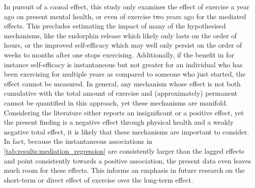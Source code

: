 In pursuit of a causal effect, this study only examines the effect of exercise a year ago on present mental health,
or even of exercise two years ago for the mediated effects.
This precludes estimating the impact of many of the hypothesised mechanisms, like the endorphin release which
likely only lasts on the order of hours, or the improved self-efficacy which may well only persist on the order of
weeks to months after one stops exercising.
Additionally, if the benefit in for instance self-efficacy is instantaneous but not greater for an individual
who has been exercising for multiple years as compared to someone who just started, the effect cannot be measured.
In general, any mechanism whose effect is not both cumulative with the total amount of exercise and (approximately)
permanent cannot be quantified in this approach, yet these mechanisms are manifold.
Considering the literature either reports an insignificant or a positive effect, yet the present finding is a
negative effect through physical health and a weakly negative total effect, it is likely that these
mechanisms are important to consider.
In fact, because the instantaneous associations in \cref{tab:results:mediation_regression} are consistently larger
than the lagged effects and point consistently towards a positive association,
the present data even leaves much room for these effects.
This informs an emphasis in future research on the short-term or direct effect of exercise over the long-term effect.

